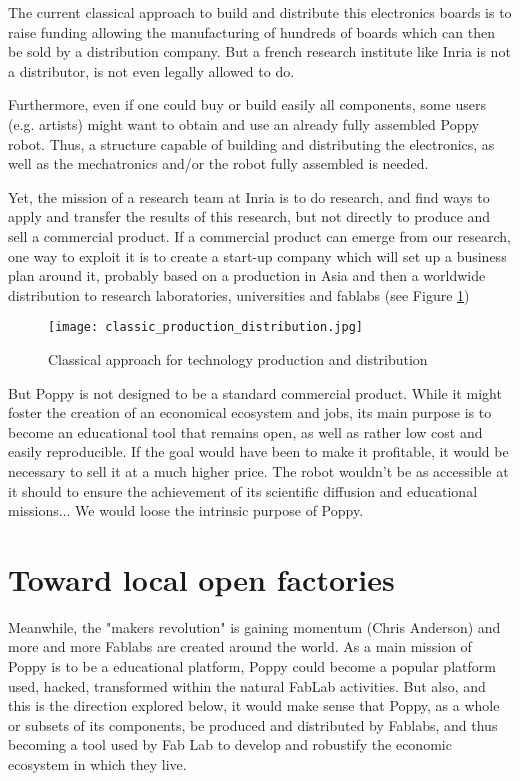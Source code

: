 The current classical approach to build and distribute this electronics boards is to raise funding allowing the manufacturing of hundreds of boards which can then be sold by a distribution company. But a french research institute like Inria is not a distributor,  is not even legally allowed to do.

Furthermore, even if one could buy or build easily all components, some users (e.g. artists) might want to obtain and use an already fully assembled Poppy robot. Thus, a structure capable of building and distributing the electronics, as well as the mechatronics and/or the robot fully assembled is needed.

Yet, the mission of a research team at Inria is to do research, and find ways to apply and transfer the results of this research, but not directly to produce and sell a commercial product. If a commercial product can emerge from our research, one way to exploit it is to create a start-up company which will set up a business plan around it, probably based on a production in Asia and then a worldwide distribution to research laboratories, universities and fablabs (see Figure \ref{fig:classic})

\begin{figure}[h]
    \begin{center}
        \texttt{[image: classic\_production\_distribution.jpg]}
    \end{center}
    \caption{Classical approach for technology production and distribution}
    \label{fig:classic}
\end{figure}


But Poppy is not designed to be a standard commercial product. While it might foster the creation of an economical ecosystem and jobs, its main purpose is to become an educational tool that remains open, as well as rather low cost and easily reproducible. If the goal would have been to make it profitable, it would be necessary to sell it at a much higher price. The robot wouldn't be as accessible at it should to ensure the achievement of its scientific diffusion and educational missions... We would loose the intrinsic purpose of Poppy.

\section{Toward local open factories } %

Meanwhile, the "makers revolution" is gaining momentum (Chris Anderson) and more and more Fablabs are created around the world. As a main mission of Poppy is to be a educational platform, Poppy could become a popular platform used, hacked, transformed within the natural FabLab activities. But also, and this is the direction explored below,  it would make sense that  Poppy, as a whole or subsets of its components, be produced and distributed by Fablabs, and thus becoming a tool used by Fab Lab to develop and robustify the economic ecosystem in which they live.

